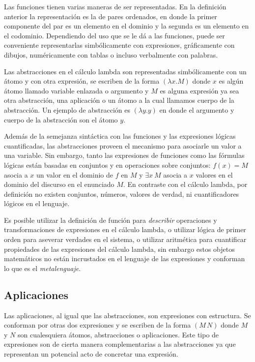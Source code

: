 Las funciones tienen varias maneras de ser representadas. En la definición anterior la representación es la de pares ordenados, en donde la primer componente del par es un elemento en el dominio y la segunda es un elemento en el codominio. Dependiendo del uso que se le dá a las funciones, puede ser conveniente representarlas simbólicamente con expresiones, gráficamente con dibujos, numéricamente con tablas o incluso verbalmente con palabras.

Las abstracciones en el cálculo lambda son representadas simbólicamente con un átomo y con otra expresión, se escriben de la forma \( (λx.M) \) donde \( x \) es algún átomo llamado variable enlazada o argumento y \( M \) es alguna expresión ya sea otra abstracción, una aplicación o un átomo a la cual llamamos cuerpo de la abstracción. Un ejemplo de abstracción es \( (λy.y) \) en donde el argumento y cuerpo de la abstracción son el átomo \( y \).

Además de la semejanza sintáctica con las funciones y las expresiones lógicas cuantificadas, las abstracciones proveen el mecanismo para asociarle un valor a una variable. Sin embargo, tanto las expresiones de funciones como las fórmulas lógicas están basadas en conjuntos y en operaciones sobre conjuntos: \( f(x)=M \) asocia a \( x \) un valor en el dominio de \( f \) en \( M \) y \( \exists x\ M \) asocia a \( x \) valores en el dominio del discurso en el enunciado \( M \). En contraste con el cálculo lambda, por definición no existen conjuntos, números, valores de verdad, ni cuantificadores lógicos en el lenguaje.

Es posible utilizar la definición de función para \emph{describir} operaciones y transformaciones de expresiones en el cálculo lambda, o utilizar lógica de primer orden para aseverar verdades en el sistema, o utilizar aritmética para cuantificar propiedades de las expresiones del cálculo lambda, sin embargo estos objetos matemáticos no están incrustados en el lenguaje de las expresiones y conforman lo que es el \emph{metalenguaje}.


\subsection{Aplicaciones}
\label{sec:aplicaciones}

Las aplicaciones, al igual que las abstracciones, son expresiones con estructura. Se conforman por otras dos expresiones y se escriben de la forma \( (M\, N) \) donde \( M \) y \( N \) son cualesquiera átomos, abstracciones o aplicaciones. Este tipo de expresiones son de cierta manera complementarias a las abstracciones ya que representan un potencial acto de concretar una expresión.

